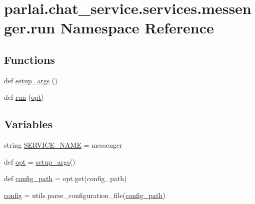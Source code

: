 \hypertarget{namespaceparlai_1_1chat__service_1_1services_1_1messenger_1_1run}{}\section{parlai.\+chat\+\_\+service.\+services.\+messenger.\+run Namespace Reference}
\label{namespaceparlai_1_1chat__service_1_1services_1_1messenger_1_1run}
\subsection*{Functions}
\begin{DoxyCompactItemize}
\item 
def \hyperlink{namespaceparlai_1_1chat__service_1_1services_1_1messenger_1_1run_a17bafea2534d593de1fbf1e0724e5b67}{setup\+\_\+args} ()
\item 
def \hyperlink{namespaceparlai_1_1chat__service_1_1services_1_1messenger_1_1run_ac422f71a04fc8363a81107c148e9ece2}{run} (\hyperlink{namespaceparlai_1_1chat__service_1_1services_1_1messenger_1_1run_ac84dd0e69d5ca482edbe9af981524f7a}{opt})
\end{DoxyCompactItemize}
\subsection*{Variables}
\begin{DoxyCompactItemize}
\item 
string \hyperlink{namespaceparlai_1_1chat__service_1_1services_1_1messenger_1_1run_a035506dbf48abd8274f8da5d168fb54a}{S\+E\+R\+V\+I\+C\+E\+\_\+\+N\+A\+ME} = \textquotesingle{}messenger\textquotesingle{}
\item 
def \hyperlink{namespaceparlai_1_1chat__service_1_1services_1_1messenger_1_1run_ac84dd0e69d5ca482edbe9af981524f7a}{opt} = \hyperlink{namespaceparlai_1_1chat__service_1_1services_1_1messenger_1_1run_a17bafea2534d593de1fbf1e0724e5b67}{setup\+\_\+args}()
\item 
def \hyperlink{namespaceparlai_1_1chat__service_1_1services_1_1messenger_1_1run_ae0152f9266b964ec0b79975b95f10a27}{config\+\_\+path} = opt.\+get(\textquotesingle{}config\+\_\+path\textquotesingle{})
\item 
\hyperlink{namespaceparlai_1_1chat__service_1_1services_1_1messenger_1_1run_aa5dcaaace4024e255bfdbebea518be6d}{config} = utils.\+parse\+\_\+configuration\+\_\+file(\hyperlink{namespaceparlai_1_1chat__service_1_1services_1_1messenger_1_1run_ae0152f9266b964ec0b79975b95f10a27}{config\+\_\+path})
\end{DoxyCompactItemize}


